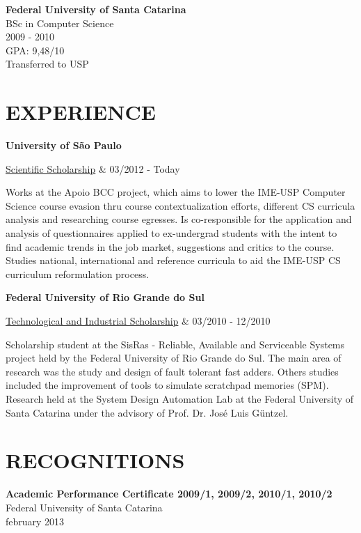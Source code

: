 \documentclass[margin=<value>,11pt]{res} %
\begin{document}
\begin{resume}
	{\bf Federal University of Santa Catarina}\\
	BSc in Computer Science \\
	2009 - 2010 \\
	GPA: 9,48/10 \\
	Transferred to USP \\

\vfill
\section{EXPERIENCE}
	{\bf University of São Paulo} \\
		\begin{ncolumn}{2} %
		\underline{Scientific Scholarship}     &      03/2012 - Today
		\end{ncolumn}
		Works at the Apoio BCC project, which aims to lower the IME-USP Computer Science course evasion thru course contextualization efforts, different CS curricula analysis and researching course egresses. Is co-responsible for the application and analysis of questionnaires applied to ex-undergrad students with the intent to find academic trends in the job market, suggestions and critics to the course. Studies national, international and reference curricula to aid the IME-USP CS curriculum reformulation process.

	{\bf Federal University of Rio Grande do Sul} \\
		\begin{ncolumn}{2} %
		\underline{Technological and Industrial Scholarship}     &      03/2010 - 12/2010
		\end{ncolumn}
		Scholarship student at the SisRas - Reliable, Available and Serviceable Systems project held by the Federal University of Rio Grande do Sul. The main area of research was the study and design of fault tolerant fast adders. Others studies included the improvement of tools to simulate scratchpad memories (SPM). Research held at the System Design Automation Lab at the Federal University of Santa Catarina under the advisory of Prof. Dr. José Luis Güntzel.
 
\section{RECOGNITIONS}
	{\bf Academic Performance Certificate 2009/1, 2009/2, 2010/1, 2010/2}\\
	Federal University of Santa Catarina\\
	february 2013


\end{resume}
\end{document}
